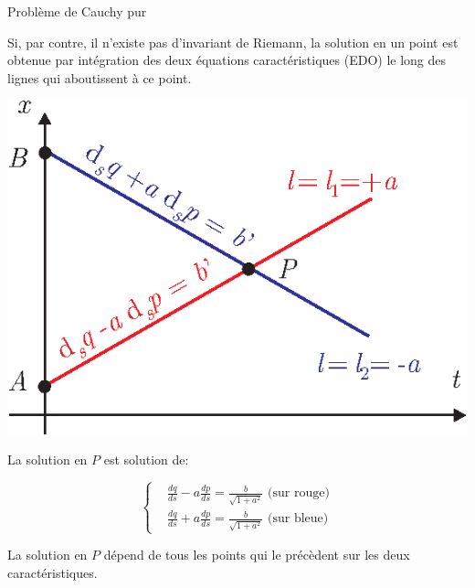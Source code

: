 \documentclass[
mode=present,    %
paper=a4paper,   %
orient=landscape,
display=slides,   %
size=10pt,
style=romain   %
]{powerdot}
\begin{document}
\begin{slide}[toc=]{Problème de Cauchy pur}

Si, par contre, il n'existe pas d'invariant de Riemann, la solution en un point est obtenue par intégration des deux équations caractéristiques (EDO) le long des lignes qui aboutissent à ce point.

\bigskip

\begin{minipage}[l]{0.4\textwidth}
    \centerline{\includegraphics[width=\textwidth]{pasriemann.eps} }
\end{minipage}
\begin{minipage}[l]{0.55\textwidth}
La solution en $P$ est solution de:

\begin{equation*}
    \left\{
    \begin{aligned}
        & \frac{dq}{ds} - a \frac{dp}{ds} = \frac{b}{\sqrt{1+a^2}} \text{ (sur rouge)}  \\
        & \frac{dq}{ds} + a \frac{dp}{ds} = \frac{b}{\sqrt{1+a^2}} \text{ (sur bleue)}
    \end{aligned}
    \right.
\end{equation*}
\end{minipage}

\bigskip

La solution en $P$ dépend de tous les points qui le précèdent sur les deux caractéristiques.

\end{slide}
\end{document}
